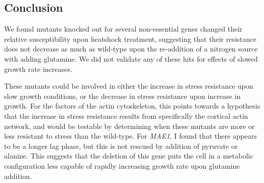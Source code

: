 
\subsection{Conclusion}

We found mutants knocked out for several non-essential genes changed
their relative susceptibility upon heatshock treatment, suggesting
that their resistance does not decrease as much as wild-type upon the
re-addition of a nitrogen source with adding glutamine.
We did not validate any of these hits for effects of slowed growth
rate increases.

These mutants could be involved in either the increase in stress
resistance upon slow growth conditions, or the decrease in stress
resistance upon increase in growth. 
For the factors of the actin cytoskeleton, this points towards a
hypothesis that the increase in stress resistance results from
specifically the cortical actin network, and would be testable by
determining when these mutants are more or less resistant to stress
than the wild-type. For \textit{MAE1}, I found that there appears to
be a longer lag phase, but this is not rescued by addition of pyruvate
or alanine. This suggests that the deletion of this gene puts the cell
in a metabolic configuration less capable of rapidly increasing growth
rate upon glutamine addition.

\iffalse
%
%
%
\section{Apparent cell-cycle halt upon nitrogen-upshift}
%
%
%

Apparent cell-cycle halt upon
glutamine addition Previous work on cell cycle halt, basically just
alberghina, PKA and CLN1 This phenomenon has been previously seen.
Upshift ecoli, they get bigger.  This is thought to be because the
critical cell size threshold has been reset by growth signalling
pathways to a larger size. However, this result might argue that
instead it could be regulated by CLN1 transcript abundance.
Alberghina’s demonstrated that depends on Swi4?p, so there you go

Later, it has been shown that this halt in growth seems to occur
through a PKA-mediated repression of
CLN1$\cite{jiang1998??,$tokiwa1994??}



Experiment, results Conclusion ( anything that didn’t get into chapter
3 )
\fi
